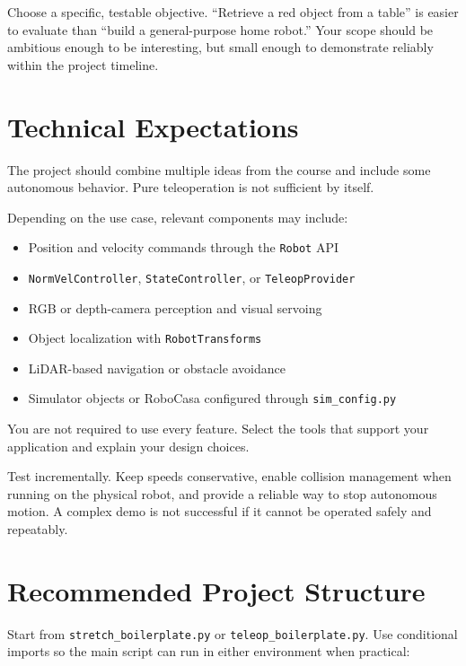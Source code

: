 \documentclass[11pt,a4paper]{article}
\begin{document}
Choose a specific, testable objective. ``Retrieve a red object from a table''
is easier to evaluate than ``build a general-purpose home robot.'' Your scope
should be ambitious enough to be interesting, but small enough to demonstrate
reliably within the project timeline.

\section*{Technical Expectations}

The project should combine multiple ideas from the course and include some
autonomous behavior. Pure teleoperation is not sufficient by itself.

Depending on the use case, relevant components may include:

\begin{itemize}
    \item Position and velocity commands through the \texttt{Robot} API
    \item \texttt{NormVelController}, \texttt{StateController}, or
          \texttt{TeleopProvider}
    \item RGB or depth-camera perception and visual servoing
    \item Object localization with \texttt{RobotTransforms}
    \item LiDAR-based navigation or obstacle avoidance
    \item Simulator objects or RoboCasa configured through
          \texttt{sim\_config.py}
\end{itemize}

You are not required to use every feature. Select the tools that support your
application and explain your design choices.

\begin{notebox}
Test incrementally. Keep speeds conservative, enable collision management when
running on the physical robot, and provide a reliable way to stop autonomous
motion. A complex demo is not successful if it cannot be operated safely and
repeatably.
\end{notebox}

\section*{Recommended Project Structure}

Start from \texttt{stretch\_boilerplate.py} or
\texttt{teleop\_boilerplate.py}. Use conditional imports so the main script
can run in either environment when practical:
\end{document}
